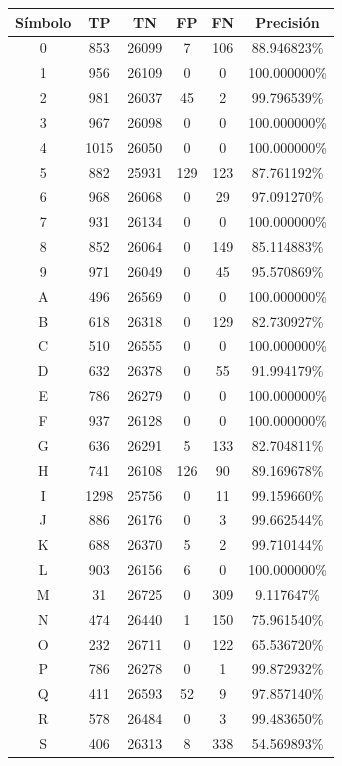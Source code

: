 \documentclass[a4paper, 11pt, oneside]{report}
\begin{document}
\begin{table}
\centering
\begin{tabular}{|c|c|c|c|c|c|}
\hline
Símbolo & TP & TN & FP & FN & Precisión \\ 
\hline
0 & 853 & 26099 & 7 & 106 & 88.946823\% \\ 
1 & 956 & 26109 & 0 & 0 & 100.000000\% \\ 
2 & 981 & 26037 & 45 & 2 & 99.796539\% \\ 
3 & 967 & 26098 & 0 & 0 & 100.000000\% \\ 
4 & 1015 & 26050 & 0 & 0 & 100.000000\% \\ 
5 & 882 & 25931 & 129 & 123 & 87.761192\% \\ 
6 & 968 & 26068 & 0 & 29 & 97.091270\% \\ 
7 & 931 & 26134 & 0 & 0 & 100.000000\% \\ 
8 & 852 & 26064 & 0 & 149 & 85.114883\% \\ 
9 & 971 & 26049 & 0 & 45 & 95.570869\% \\ 
A & 496 & 26569 & 0 & 0 & 100.000000\% \\ 
B & 618 & 26318 & 0 & 129 & 82.730927\% \\ 
C & 510 & 26555 & 0 & 0 & 100.000000\% \\ 
D & 632 & 26378 & 0 & 55 & 91.994179\% \\ 
E & 786 & 26279 & 0 & 0 & 100.000000\% \\ 
F & 937 & 26128 & 0 & 0 & 100.000000\% \\ 
G & 636 & 26291 & 5 & 133 & 82.704811\% \\ 
H & 741 & 26108 & 126 & 90 & 89.169678\% \\ 
I & 1298 & 25756 & 0 & 11 & 99.159660\% \\ 
J & 886 & 26176 & 0 & 3 & 99.662544\% \\ 
K & 688 & 26370 & 5 & 2 & 99.710144\% \\ 
L & 903 & 26156 & 6 & 0 & 100.000000\% \\ 
M & 31 & 26725 & 0 & 309 & 9.117647\% \\ 
N & 474 & 26440 & 1 & 150 & 75.961540\% \\ 
O & 232 & 26711 & 0 & 122 & 65.536720\% \\ 
P & 786 & 26278 & 0 & 1 & 99.872932\% \\ 
Q & 411 & 26593 & 52 & 9 & 97.857140\% \\ 
R & 578 & 26484 & 0 & 3 & 99.483650\% \\ 
S & 406 & 26313 & 8 & 338 & 54.569893\% \\ 

\end{tabular}
\end{table}
\end{document}
